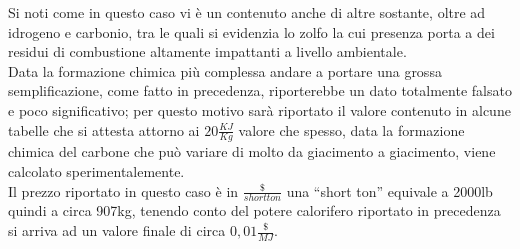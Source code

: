 Si noti come in questo caso vi è un contenuto anche di altre sostante, oltre ad idrogeno e carbonio, tra le quali si evidenzia lo zolfo la cui presenza porta a dei residui di combustione altamente impattanti a livello ambientale.\\
Data la formazione chimica più complessa andare a portare una grossa semplificazione, come fatto in precedenza, riporterebbe un dato totalmente falsato e poco significativo; per questo motivo sarà riportato il valore contenuto in alcune tabelle che si attesta attorno ai  $20\frac{KJ}{Kg}$ valore che spesso, data la formazione chimica del carbone che può variare di molto da giacimento a giacimento, viene calcolato sperimentalemente.\\
Il prezzo riportato in questo caso è in $\frac{\$}{short ton}$ una \enquote{short ton} equivale a 2000lb quindi a circa 907kg, tenendo conto del potere calorifero riportato in precedenza si arriva ad un valore finale di circa $0,01\frac{\$}{MJ}$.
